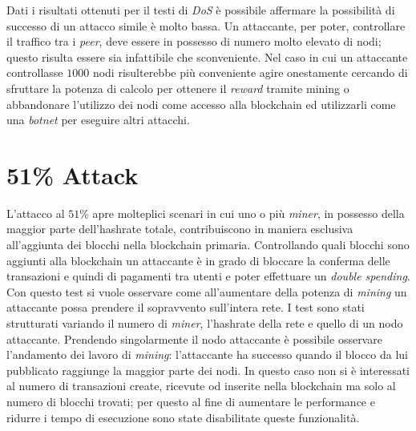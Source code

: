 Dati i risultati ottenuti per il testi di \textit{DoS} è possibile affermare la possibilità di successo di un attacco simile è molto bassa. Un attaccante, per poter, controllare il traffico tra i \textit{peer}, deve essere in possesso di numero molto elevato di nodi; questo risulta essere sia infattibile che sconveniente. Nel caso in cui un attaccante controllasse $1000$ nodi risulterebbe più conveniente agire onestamente cercando di sfruttare la potenza di calcolo per ottenere il \textit{reward} tramite mining o abbandonare l'utilizzo dei nodi come accesso alla blockchain ed utilizzarli come una \textit{botnet} per eseguire altri attacchi.

\clearpage
\section{51\% Attack}
L'attacco al $51\%$ apre molteplici scenari in cui uno o più \textit{miner}, in possesso della maggior parte dell'hashrate totale, contribuiscono in maniera esclusiva all'aggiunta dei blocchi nella blockchain primaria. Controllando quali blocchi sono aggiunti alla blockchain un attaccante è in grado di bloccare la conferma delle transazioni e quindi di pagamenti tra utenti e poter effettuare un \textit{double spending}.\newline
Con questo test si vuole osservare come all'aumentare della potenza di \textit{mining} un attaccante possa prendere il sopravvento sull'intera rete.\newline
I test sono stati strutturati variando il numero di \textit{miner}, l'hashrate della rete e quello di un nodo attaccante. Prendendo singolarmente il nodo attaccante è possibile osservare l'andamento dei lavoro di \textit{mining}: l'attaccante ha successo quando il blocco da lui pubblicato raggiunge la maggior parte dei nodi. In questo caso non si è interessati al numero di transazioni create, ricevute od inserite nella blockchain ma solo al numero di blocchi trovati; per questo al fine di aumentare le performance e ridurre i tempo di esecuzione sono state disabilitate queste funzionalità.
